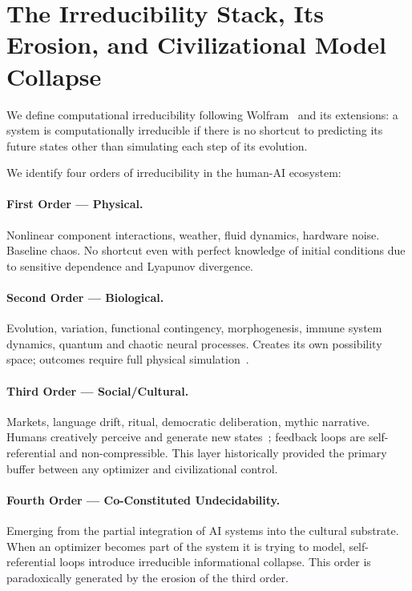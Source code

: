 \documentclass[11pt, a4paper]{article}
\theoremstyle{remark}
\begin{document}
\section{The Irreducibility Stack, Its Erosion, and Civilizational Model Collapse}\label{sec:irreducibility}

We define computational irreducibility following Wolfram~\cite{wolfram2002} and its extensions: a system is computationally irreducible if there is no shortcut to predicting its future states other than simulating each step of its evolution.

We identify four orders of irreducibility in the human-AI ecosystem:

\paragraph{First Order --- Physical.} Nonlinear component interactions, weather, fluid dynamics, hardware noise. Baseline chaos. No shortcut even with perfect knowledge of initial conditions due to sensitive dependence and Lyapunov divergence.

\paragraph{Second Order --- Biological.} Evolution, variation, functional contingency, morphogenesis, immune system dynamics, quantum and chaotic neural processes. Creates its own possibility space; outcomes require full physical simulation~\cite{feynman1982}.

\paragraph{Third Order --- Social/Cultural.} Markets, language drift, ritual, democratic deliberation, mythic narrative. Humans creatively perceive and generate new states~\cite{beckage2013}; feedback loops are self-referential and non-compressible. This layer historically provided the primary buffer between any optimizer and civilizational control.

\paragraph{Fourth Order --- Co-Constituted Undecidability.} Emerging from the partial integration of AI systems into the cultural substrate. When an optimizer becomes part of the system it is trying to model, self-referential loops introduce irreducible informational collapse. This order is paradoxically generated by the erosion of the third order.
\end{document}
